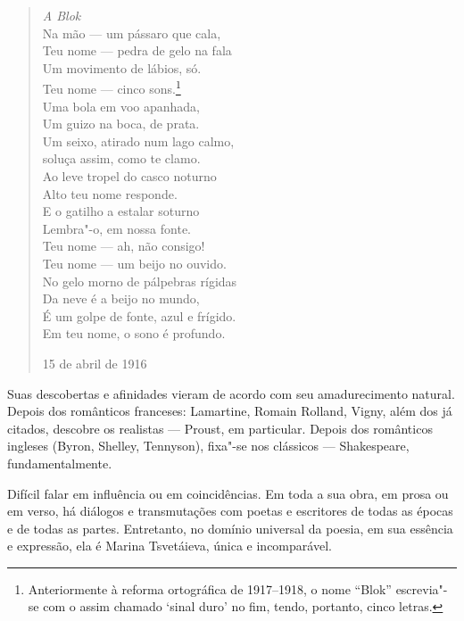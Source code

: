 \begin{verse}
\emph{A Blok} \\[8pt]
Na mão --- um pássaro que cala, \\
Teu nome --- pedra de gelo na fala \\
Um movimento de lábios, só. \\
Teu nome --- cinco sons.\footnote{Anteriormente à reforma ortográfica de 1917--1918, o nome ``Blok'' escrevia"-se com o assim chamado `sinal duro' no fim, tendo, portanto, cinco letras.} \\
Uma bola em voo apanhada, \\
Um guizo na boca, de prata. \\[8pt]
Um seixo, atirado num lago calmo, \\
soluça assim, como te clamo. \\
Ao leve tropel do casco noturno \\
Alto teu nome responde. \\
E o gatilho a estalar soturno \\
Lembra"-o, em nossa fonte. \\[8pt]
Teu nome --- ah, não consigo! \\
Teu nome --- um beijo no ouvido. \\
No gelo morno de pálpebras rígidas \\
Da neve é a beijo no mundo, \\
É um golpe de fonte, azul e frígido. \\
Em teu nome, o sono é profundo. 

15 de abril de 1916

\end{verse}

Suas descobertas e afinidades vieram de acordo com seu
amadurecimento natural. Depois dos românticos franceses:
Lamartine, Romain Rolland, Vigny, além dos já citados, descobre
os realistas --- Proust, em particular. Depois dos românticos
ingleses (Byron, Shelley, Tennyson), fixa"-se nos clássicos ---
Shakespeare, fundamentalmente.

Difícil falar em influência ou em coincidências. Em toda a sua
obra, em prosa ou em verso, há diálogos e transmutações com poetas
e escritores de todas as épocas e de todas as partes. Entretanto,
no domínio universal da poesia, em sua essência e expressão, ela
é Marina Tsvetáieva, única e incomparável.


